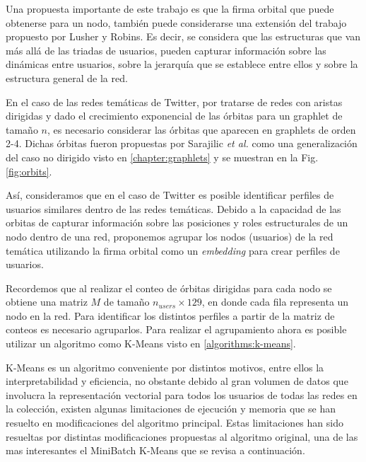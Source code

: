Una propuesta importante de este trabajo es que la firma orbital que puede obtenerse para un nodo, también puede considerarse una extensión del trabajo propuesto por Lusher y Robins. Es decir, se considera que las estructuras que van más allá de las triadas de usuarios, pueden capturar información sobre las dinámicas entre usuarios, sobre la jerarquía que se establece entre ellos y sobre la estructura general de la red. 

En el caso de las redes temáticas de Twitter, por tratarse de redes con aristas dirigidas y dado el crecimiento exponencial de las órbitas para un graphlet de tamaño $n$, es necesario considerar las órbitas que aparecen en graphlets de orden 2-4. Dichas órbitas fueron propuestas por Sarajilic \textit{et al.} como una generalización del caso no dirigido visto en \ref{chapter:graphlets} y se muestran en la Fig. \ref{fig:orbits}. 

Así, consideramos que en el caso de Twitter es posible identificar perfiles de usuarios similares dentro de las redes temáticas. Debido a la capacidad de las orbitas de capturar información sobre las posiciones y roles estructurales de un nodo dentro de una red, proponemos agrupar los nodos (usuarios) de la red temática utilizando la firma orbital como un \textit{embedding} para crear perfiles de usuarios.

Recordemos que al realizar el conteo de órbitas dirigidas para cada nodo se obtiene una matriz $M$ de tamaño $n_{users}\times 129$, en donde cada fila representa un nodo en la red. Para identificar los distintos perfiles a partir de la matriz de conteos es necesario agruparlos. Para realizar el agrupamiento ahora es posible utilizar un algoritmo como K-Means visto en \ref{algorithms:k-means}.


K-Means es un algoritmo conveniente por distintos motivos, entre ellos la interpretabilidad y eficiencia, no obstante debido al gran volumen de datos que involucra la representación vectorial para todos los usuarios de todas las redes en la colección, existen algunas limitaciones de ejecución y memoria que se han resuelto en modificaciones del algoritmo principal. Estas limitaciones han sido resueltas por distintas modificaciones propuestas al algoritmo original, una de las mas interesantes el MiniBatch K-Means que se revisa a continuación.

